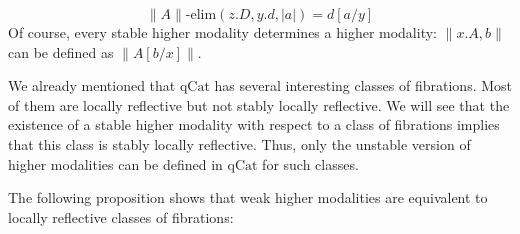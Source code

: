 \documentclass[reqno]{mscs}
\newcommand{\fs}[1]{\mathrm{#1}}
\newcommand{\qCat}{\fs{qCat}}
\numberwithin{figure}{section}
\begin{document}
\[ \| A \|\text{-}\fs{elim}(z.D, y.d, |a|) = d[a/y] \]
Of course, every stable higher modality determines a higher modality: $\| x.A, b \|$ can be defined as $\| A[b/x] \|$.

\begin{example}
We already mentioned that $\qCat$ has several interesting classes of fibrations.
Most of them are locally reflective but not stably locally reflective.
We will see that the existence of a stable higher modality with respect to a class of fibrations implies that this class is stably locally reflective.
Thus, only the unstable version of higher modalities can be defined in $\qCat$ for such classes.
\end{example}

The following proposition shows that weak higher modalities are equivalent to locally reflective classes of fibrations:
\end{document}
